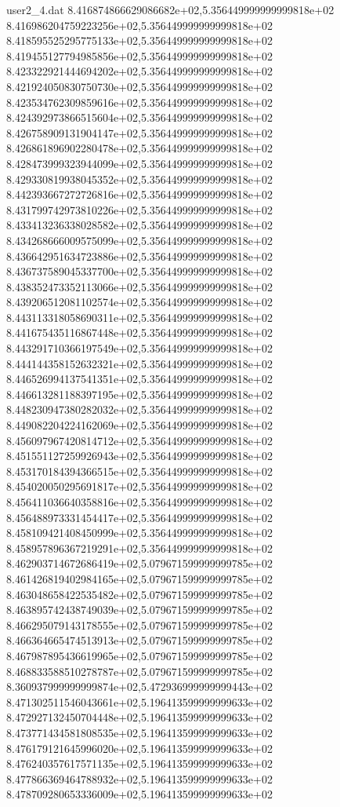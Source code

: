 \begin{filecontents}{user2_4.dat}
8.416874866629086682e+02,5.356449999999999818e+02
8.416986204759223256e+02,5.356449999999999818e+02
8.418595525295775133e+02,5.356449999999999818e+02
8.419455127794985856e+02,5.356449999999999818e+02
8.423322921444694202e+02,5.356449999999999818e+02
8.421924050830750730e+02,5.356449999999999818e+02
8.423534762309859616e+02,5.356449999999999818e+02
8.424392973866515604e+02,5.356449999999999818e+02
8.426758909131904147e+02,5.356449999999999818e+02
8.426861896902280478e+02,5.356449999999999818e+02
8.428473999323944099e+02,5.356449999999999818e+02
8.429330819938045352e+02,5.356449999999999818e+02
8.442393667272726816e+02,5.356449999999999818e+02
8.431799742973810226e+02,5.356449999999999818e+02
8.433413236338028582e+02,5.356449999999999818e+02
8.434268666009575099e+02,5.356449999999999818e+02
8.436642951634723886e+02,5.356449999999999818e+02
8.436737589045337700e+02,5.356449999999999818e+02
8.438352473352113066e+02,5.356449999999999818e+02
8.439206512081102574e+02,5.356449999999999818e+02
8.443113318058690311e+02,5.356449999999999818e+02
8.441675435116867448e+02,5.356449999999999818e+02
8.443291710366197549e+02,5.356449999999999818e+02
8.444144358152632321e+02,5.356449999999999818e+02
8.446526994137541351e+02,5.356449999999999818e+02
8.446613281188397195e+02,5.356449999999999818e+02
8.448230947380282032e+02,5.356449999999999818e+02
8.449082204224162069e+02,5.356449999999999818e+02
8.456097967420814712e+02,5.356449999999999818e+02
8.451551127259926943e+02,5.356449999999999818e+02
8.453170184394366515e+02,5.356449999999999818e+02
8.454020050295691817e+02,5.356449999999999818e+02
8.456411036640358816e+02,5.356449999999999818e+02
8.456488973331454417e+02,5.356449999999999818e+02
8.458109421408450999e+02,5.356449999999999818e+02
8.458957896367219291e+02,5.356449999999999818e+02
8.462903714672686419e+02,5.079671599999999785e+02
8.461426819402984165e+02,5.079671599999999785e+02
8.463048658422535482e+02,5.079671599999999785e+02
8.463895742438749039e+02,5.079671599999999785e+02
8.466295079143178555e+02,5.079671599999999785e+02
8.466364665474513913e+02,5.079671599999999785e+02
8.467987895436619965e+02,5.079671599999999785e+02
8.468833588510278787e+02,5.079671599999999785e+02
8.360937999999999874e+02,5.472936999999999443e+02
8.471302511546043661e+02,5.196413599999999633e+02
8.472927132450704448e+02,5.196413599999999633e+02
8.473771434581808535e+02,5.196413599999999633e+02
8.476179121645996020e+02,5.196413599999999633e+02
8.476240357617571135e+02,5.196413599999999633e+02
8.477866369464788932e+02,5.196413599999999633e+02
8.478709280653336009e+02,5.196413599999999633e+02

\end{filecontents}
